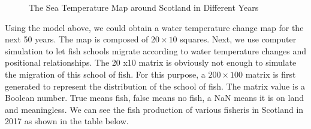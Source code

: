 \documentclass{mcmthesis}
\numberwithin{figure}{section}
\numberwithin{table}{section}
\begin{document}
\begin{figure}[H]
  \centering
  \hspace{0in}
  \label{SeaT}
  \caption{The Sea Temperature Map around Scotland in Different Years}
  \end{figure}
Using the model above, we could obtain a water temperature change map for the next 50 years. The map is composed of $20 \times 10$ squares. Next, we use computer simulation to let fish schools migrate according to water temperature changes and positional relationships. The 20 x10 matrix is obviously not enough to simulate the migration of this school of fish. For this purpose, a $200 \times 100$ matrix is first generated to represent the distribution of the school of fish. The matrix value is a Boolean number. True means fish, false means no fish, a NaN means it is on land and meaningless. We can see the fish production of various fisheris in Scotland in 2017 as shown in the table below.
\end{document}
